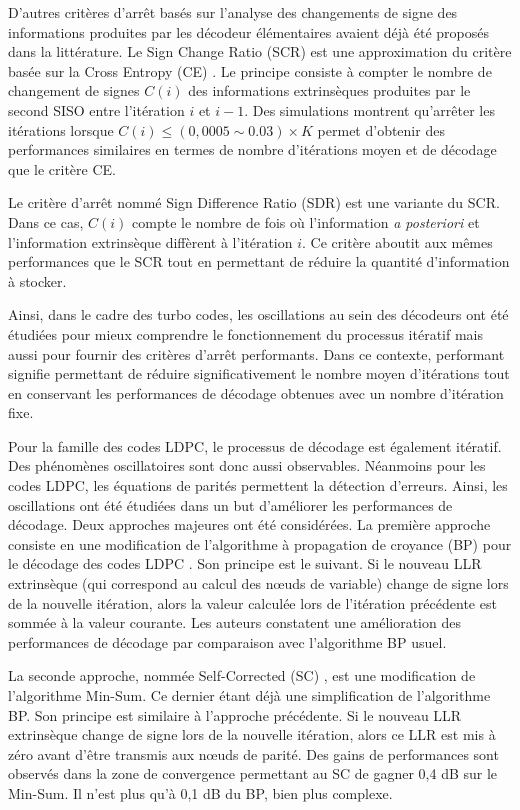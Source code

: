D'autres critères d'arrêt basés sur l'analyse des changements de signe des informations produites par les décodeur 
élémentaires avaient déjà été proposés dans la littérature. Le Sign Change Ratio (SCR) \cite{fossorier_scr} est une 
approximation du critère basée sur la Cross Entropy (CE) \cite{hagenauer_ce}. Le principe consiste à compter le nombre de 
changement de signes $C(i)$ des informations extrinsèques produites par le second SISO entre l'itération $i$ et $i-1$. 
Des simulations montrent qu'arrêter les itérations lorsque $C(i)\leq (0,0005 \sim 0.03)\times K$ permet d'obtenir des 
performances similaires en termes de nombre d'itérations moyen et de décodage que le critère CE.

Le critère d'arrêt nommé Sign Difference Ratio (SDR) \cite{fossorier_scr} est une variante du SCR. Dans ce cas, $C(i)$ 
compte le nombre de fois où l'information \textit{a posteriori} et l'information extrinsèque diffèrent à l'itération $i$. 
Ce critère aboutit aux mêmes performances que le SCR tout en permettant de réduire la quantité d'information à stocker.

Ainsi, dans le cadre des turbo codes, les oscillations au sein des décodeurs ont été étudiées pour mieux comprendre le 
fonctionnement du processus itératif mais aussi pour fournir des critères d'arrêt performants. Dans ce contexte, performant 
signifie permettant de réduire significativement le nombre moyen d'itérations tout en conservant les performances de 
décodage obtenues avec un nombre d'itération fixe.

Pour la famille des codes LDPC, le processus de décodage est également itératif. Des phénomènes oscillatoires sont donc aussi 
observables. Néanmoins pour les codes LDPC, les équations de parités permettent la détection d'erreurs. Ainsi, 
les oscillations ont été étudiées dans un but d'améliorer les performances de décodage. Deux approches majeures ont été 
considérées. La première approche consiste en une modification de l'algorithme à propagation de croyance (BP) pour le 
décodage des codes LDPC \cite{gounai_bp_osc}. Son principe est le suivant. Si le nouveau LLR extrinsèque (qui correspond 
au calcul des nœuds de variable) change de signe lors de la nouvelle itération, alors la valeur calculée lors de 
l'itération précédente est sommée à la valeur courante. Les auteurs constatent une amélioration des performances de décodage par 
comparaison avec l'algorithme BP usuel.

La seconde approche, nommée Self-Corrected (SC) \cite{savin_sc}, est une modification de l'algorithme Min-Sum. Ce dernier 
étant déjà une simplification de l'algorithme BP. Son principe est similaire à l'approche précédente. Si le nouveau LLR 
extrinsèque change de signe lors de la nouvelle itération, alors ce LLR est mis à zéro avant d'être transmis aux nœuds de 
parité. Des gains de performances sont observés dans la zone de convergence permettant au SC de gagner 0,4 dB sur le 
Min-Sum. Il n'est plus qu'à 0,1 dB du BP, bien plus complexe.

